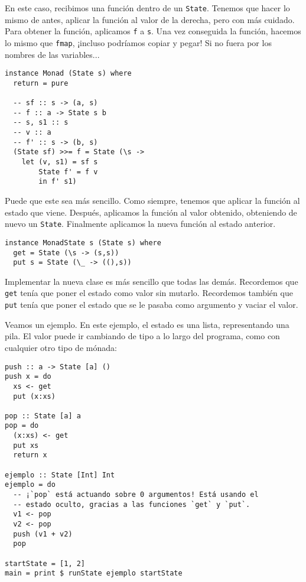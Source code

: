 \documentclass[class=article, crop=false]{standalone}
\begin{document}
En este caso, recibimos una función dentro de un \verb`State`. Tenemos que hacer lo mismo de
antes, aplicar la función al valor de la derecha, pero con más cuidado. Para obtener la
función, aplicamos \verb`f` a \verb`s`. Una vez conseguida la función, hacemos lo mismo que
\verb`fmap`, ¡incluso podríamos copiar y pegar! Si no fuera por los nombres de las
variables...

\begin{verbatim}  
instance Monad (State s) where
  return = pure

  -- sf :: s -> (a, s)
  -- f :: a -> State s b
  -- s, s1 :: s
  -- v :: a
  -- f' :: s -> (b, s)
  (State sf) >>= f = State (\s ->
    let (v, s1) = sf s
        State f' = f v
        in f' s1)
\end{verbatim}

Puede que este sea más sencillo. Como siempre, tenemos que aplicar la función al estado que
viene. Después, aplicamos la función al valor obtenido, obteniendo de nuevo un \verb`State`.
Finalmente aplicamos la nueva función al estado anterior.

\begin{verbatim}  
instance MonadState s (State s) where
  get = State (\s -> (s,s))
  put s = State (\_ -> ((),s))
\end{verbatim}

Implementar la nueva clase es más sencillo que todas las demás. Recordemos que \verb`get`
tenía que poner el estado como valor sin mutarlo. Recordemos también que \verb`put` tenía que
poner el estado que se le pasaba como argumento y vaciar el valor.

Veamos un ejemplo. En este ejemplo, el estado es una lista, representando una pila. El valor
puede ir cambiando de tipo a lo largo del programa, como con cualquier otro tipo de mónada:

\begin{verbatim}  
push :: a -> State [a] ()
push x = do
  xs <- get
  put (x:xs)

pop :: State [a] a
pop = do
  (x:xs) <- get
  put xs
  return x

ejemplo :: State [Int] Int
ejemplo = do
  -- ¡`pop` está actuando sobre 0 argumentos! Está usando el
  -- estado oculto, gracias a las funciones `get` y `put`.
  v1 <- pop
  v2 <- pop
  push (v1 + v2)
  pop

startState = [1, 2]
main = print $ runState ejemplo startState
\end{verbatim}
\end{document}
